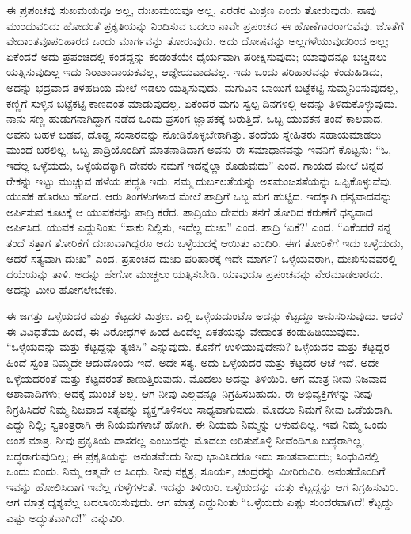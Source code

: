 \vskip 0.2cm 

ಈ ಪ್ರಪಂಚವು ಸುಖಮಯವೂ ಅಲ್ಲ, ದುಃಖಮಯವೂ ಅಲ್ಲ, ಎರಡರ ಮಿಶ್ರಣ ಎಂದು ತೋರುವುದು. ನಾವು ಮುಂದುವರಿದು ಹೋದಂತೆ ಪ್ರಕೃತಿಯನ್ನು ನಿಂದಿಸುವ ಬದಲು ನಾವೇ ಪ್ರಪಂಚದ ಈ ಹೊಣೆಗಾರರಾಗುವೆವು. ಜೊತೆಗೆ ವೇದಾಂತವೂ\break ಪರಿಹಾರದ ಒಂದು ಮಾರ್ಗವನ್ನು ತೋರುವುದು. ಅದು ದೋಷವನ್ನು ಅಲ್ಲಗಳೆಯುವುದರಿಂದ ಅಲ್ಲ; ಏಕೆಂದರೆ ಅದು ಪ್ರಪಂಚದಲ್ಲಿ ಕಂಡದ್ದನ್ನು ಕಂಡಂತೆಯೇ ಧೈರ್ಯವಾಗಿ ಪರೀಕ್ಷಿಸುವುದು; ಯಾವುದನ್ನೂ ಬಚ್ಚಿಡಲು ಯತ್ನಿಸುವುದಿಲ್ಲ ಇದು ನಿರಾಶಾದಾಯಕವಲ್ಲ, ಆಜ್ಞೇಯವಾದವಲ್ಲ. ಇದು ಒಂದು ಪರಿಹಾರವನ್ನು ಕಂಡುಹಿಡಿದು, ಅದನ್ನು ಭದ್ರವಾದ ತಳಹದಿಯ ಮೇಲೆ ಇಡಲು ಯತ್ನಿಸುವುದು. ಮಗುವಿನ ಬಾಯಿಗೆ ಬಟ್ಟೆಕಟ್ಟಿ ಸುಮ್ಮನಿರಿಸುವುದಲ್ಲ, ಕಣ್ಣಿಗೆ ಸುಳ್ಳಿನ ಬಟ್ಟೆಕಟ್ಟಿ ಕಾಣದಂತೆ ಮಾಡುವುದಲ್ಲ. ಏಕೆಂದರೆ ಮಗು ಸ್ವಲ್ಪ ದಿನಗಳಲ್ಲಿ ಅದನ್ನು ತಿಳಿದುಕೊಳ್ಳುವುದು. ನಾನು ಸಣ್ಣ ಹುಡುಗನಾಗಿದ್ದಾಗ ನಡೆದ ಒಂದು ಪ್ರಸಂಗ ಜ್ಞಾಪಕಕ್ಕೆ ಬರುತ್ತಿದೆ. ಒಬ್ಬ ಯುವಕನ ತಂದೆ ಕಾಲವಾದ. ಅವನು ಬಹಳ ಬಡವ, ದೊಡ್ಡ ಸಂಸಾರವನ್ನು ನೋಡಿಕೊಳ್ಳಬೇಕಾಗಿತ್ತು. ತಂದೆಯ ಸ್ನೇಹಿತರು ಸಹಾಯಮಾಡಲು ಮುಂದೆ ಬರಲಿಲ್ಲ. ಒಬ್ಬ ಪಾದ್ರಿಯೊಂದಿಗೆ ಮಾತನಾಡಿದಾಗ ಅವನು ಈ ಸಮಾಧಾನವನ್ನು ಇವನಿಗೆ ಕೊಟ್ಟನು: “ಓ, ಇದೆಲ್ಲ ಒಳ್ಳೆಯದು, ಒಳ್ಳೆಯದಕ್ಕಾಗಿ ದೇವರು ನಮಗೆ ಇದನ್ನೆಲ್ಲಾ ಕೊಡುವುದು” ಎಂದ. ಗಾಯದ ಮೇಲೆ ಚಿನ್ನದ ರೇಕನ್ನು ಇಟ್ಟು ಮುಚ್ಚುವ ಹಳೆಯ ಪದ್ಧತಿ ಇದು. ನಮ್ಮ ದುರ್ಬಲತೆಯನ್ನು ಅಸಮಂಜಸತೆಯನ್ನು ಒಪ್ಪಿಕೊಳ್ಳುವೆವು. ಯುವಕ ಹೊರಟು ಹೋದ. ಆರು ತಿಂಗಳುಗಳಾದ ಮೇಲೆ ಪಾದ್ರಿಗೆ ಒಬ್ಬ ಮಗ ಹುಟ್ಟಿದ. ಇದಕ್ಕಾಗಿ ಧನ್ಯವಾದವನ್ನು ಅರ್ಪಿಸುವ ಕೂಟಕ್ಕೆ ಆ ಯುವಕನನ್ನು ಪಾದ್ರಿ ಕರೆದ. ಪಾದ್ರಿಯು ದೇವರು ತನಗೆ ತೋರಿದ ಕರುಣೆಗೆ ಧನ್ಯವಾದ ಅರ್ಪಿಸಿದ. ಯುವಕ ಎದ್ದುನಿಂತು “ಸಾಕು ನಿಲ್ಲಿಸು, ಇದೆಲ್ಲ ದುಃಖ” ಎಂದ. ಪಾದ್ರಿ ‘ಏಕೆ?’ ಎಂದ. “ಏಕೆಂದರೆ ನನ್ನ ತಂದೆ ಸತ್ತಾಗ ತೋರಿಕೆಗೆ ದುಃಖವಾಗಿದ್ದರೂ ಅದು ಒಳ್ಳೆಯದಕ್ಕೆ ಆಯಿತು ಎಂದಿರಿ. ಈಗ ತೋರಿಕೆಗೆ ಇದು ಒಳ್ಳೆಯದು, ಆದರೆ ಸತ್ಯವಾಗಿ ದುಃಖ” ಎಂದ. ಪ್ರಪಂಚದ ದುಃಖ ಪರಿಹಾರಕ್ಕೆ ಇದೇ ಮಾರ್ಗ? ಒಳ್ಳೆಯವರಾಗಿ, ದುಃಖಿಸುವವರಲ್ಲಿ ದಯೆಯನ್ನು ತಾಳಿ. ಅದನ್ನು ಹೇಗೋ ಮುಚ್ಚಲು ಯತ್ನಿಸಬೇಡಿ. ಯಾವುದೂ ಪ್ರಪಂಚವನ್ನು ನೇರಮಾಡಲಾರದು. ಅದನ್ನು ಮೀರಿ ಹೋಗಲೇಬೇಕು.

\vskip 0.2cm 

ಈ ಜಗತ್ತು ಒಳ್ಳೆಯದರ ಮತ್ತು ಕೆಟ್ಟದರ ಮಿಶ್ರಣ. ಎಲ್ಲಿ ಒಳ್ಳೆಯದುಂಟೊ ಅದನ್ನು ಕೆಟ್ಟದ್ದೂ ಅನುಸರಿಸುವುದು. ಆದರೆ ಈ ವಿವಿಧತೆಯ ಹಿಂದೆ, ಈ ವಿರೋಧಗಳ ಹಿಂದೆ ಹಿಂದೆಲ್ಲ ಏಕತೆಯನ್ನು ವೇದಾಂತ ಕಂಡುಹಿಡಿಯುವುದು. “ಒಳ್ಳೆಯದನ್ನು ಮತ್ತು ಕೆಟ್ಟದ್ದನ್ನು ತ್ಯಜಿಸಿ” ಎನ್ನುವುದು. ಕೊನೆಗೆ ಉಳಿಯುವುದೇನು? ಒಳ್ಳೆಯದರ ಮತ್ತು ಕೆಟ್ಟದ್ದರ ಹಿಂದೆ ಸ್ವಂತ ನಿಮ್ಮದೇ ಆದುದೊಂದು ಇದೆ. ಅದೇ ಸತ್ಯ. ಅದು ಒಳ್ಳೆಯದರ ಮತ್ತು ಕೆಟ್ಟದರ ಆಚೆ ಇದೆ. ಅದೇ ಒಳ್ಳೆಯದರಂತೆ ಮತ್ತು ಕೆಟ್ಟದರಂತೆ ಕಾಣುತ್ತಿರುವುದು. ಮೊದಲು ಅದನ್ನು ತಿಳಿಯಿರಿ. ಆಗ ಮಾತ್ರ ನೀವು ನಿಜವಾದ ಆಶಾವಾದಿಗಳು; ಅದಕ್ಕೆ ಮುಂಚೆ ಅಲ್ಲ. ಆಗ ನೀವು ಎಲ್ಲವನ್ನೂ ನಿಗ್ರಹಿಸಬಹುದು. ಈ ಅಭಿವ್ಯಕ್ತಿಗಳನ್ನು ನೀವು ನಿಗ್ರಹಿಸಿದರೆ ನಿಮ್ಮ ನಿಜವಾದ ಸತ್ಯವನ್ನು ವ್ಯಕ್ತಗೊಳಿಸಲು ಸಾಧ್ಯವಾಗುವುದು. ಮೊದಲು ನಿಮಗೆ ನೀವು ಒಡೆಯರಾಗಿ. ಎದ್ದು ನಿಲ್ಲಿ; ಸ್ವತಂತ್ರರಾಗಿ ಈ ನಿಯಮಗಳಾಚೆ ಹೋಗಿ. ಈ ನಿಯಮ ನಿಮ್ಮನ್ನು ಆಳುವುದಿಲ್ಲ. ಇವು ನಿಮ್ಮ ಒಂದು ಅಂಶ ಮಾತ್ರ. ನೀವು ಪ್ರಕೃತಿಯ ದಾಸರಲ್ಲ ಎಂಬುದನ್ನು ಮೊದಲು ಅರಿತುಕೊಳ್ಳಿ ನೀವೆಂದಿಗೂ ಬದ್ಧರಾಗಿಲ್ಲ, ಬದ್ಧರಾಗುವುದಿಲ್ಲ; ಈ ಪ್ರಕೃತಿಯನ್ನು ಅನಂತವೆಂದು ನೀವು ಭಾವಿಸಿದರೂ ಇದು ಸಾಂತವಾದುದು; ಸಿಂಧುವಿನಲ್ಲಿ ಒಂದು ಬಿಂದು. ನಿಮ್ಮ ಆತ್ಮವೇ ಆ ಸಿಂಧು. ನೀವು ನಕ್ಷತ್ರ, ಸೂರ್ಯ, ಚಂದ್ರರನ್ನು ಮೀರಿರುವಿರಿ. ಅನಂತದೊಂದಿಗೆ ಇವನ್ನು ಹೋಲಿಸಿದಾಗ ಇವೆಲ್ಲ ಗುಳ್ಳೆಗಳಂತೆ. ಇದನ್ನು ತಿಳಿಯಿರಿ. ಒಳ್ಳೆಯದನ್ನು ಮತ್ತು ಕೆಟ್ಟದ್ದನ್ನು ಆಗ ನಿಗ್ರಹಿಸುವಿರಿ. ಆಗ ಮಾತ್ರ ದೃಶ್ಯವೆಲ್ಲ ಬದಲಾಯಿಸುವುದು. ಆಗ ಮಾತ್ರ ಎದ್ದುನಿಂತು “ಒಳ್ಳೆಯದು ಎಷ್ಟು ಸುಂದರವಾಗಿದೆ! ಕೆಟ್ಟದ್ದು ಎಷ್ಟು ಅದ್ಭುತವಾಗಿದೆ!” ಎನ್ನುವಿರಿ.

